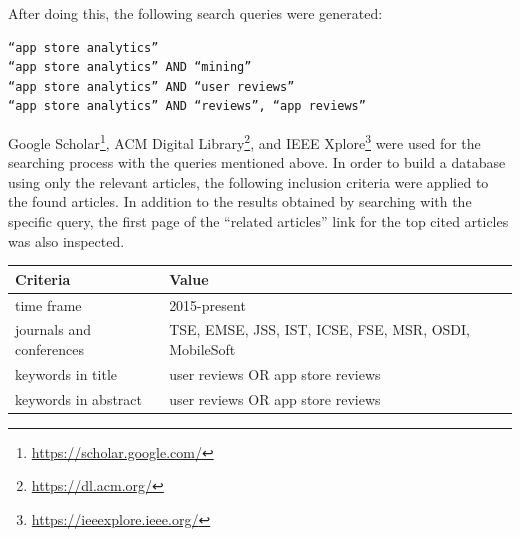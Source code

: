 \documentclass[]{book}
\let\rmarkdownfootnote\footnote%
\def\footnote{\protect\rmarkdownfootnote}
\begin{document}
After doing this, the following search queries were generated:

\begin{verbatim}
“app store analytics” 
“app store analytics” AND “mining” 
“app store analytics” AND “user reviews” 
“app store analytics” AND “reviews”, “app reviews”
\end{verbatim}

Google Scholar\footnote{\url{https://scholar.google.com/}}, ACM Digital
Library\footnote{\url{https://dl.acm.org/}}, and IEEE Xplore\footnote{\url{https://ieeexplore.ieee.org/}}
were used for the searching process with the queries mentioned above. In
order to build a database using only the relevant articles, the
following inclusion criteria were applied to the found articles. In
addition to the results obtained by searching with the specific query,
the first page of the ``related articles'' link for the top cited
articles was also inspected.

\begin{longtable}[]{@{}ll@{}}
\toprule
\begin{minipage}[b]{0.22\columnwidth}\raggedright\strut
Criteria\strut
\end{minipage} & \begin{minipage}[b]{0.18\columnwidth}\raggedright\strut
Value\strut
\end{minipage}\tabularnewline
\midrule
\endhead
\begin{minipage}[t]{0.22\columnwidth}\raggedright\strut
time frame\strut
\end{minipage} & \begin{minipage}[t]{0.18\columnwidth}\raggedright\strut
2015-present\strut
\end{minipage}\tabularnewline
\begin{minipage}[t]{0.22\columnwidth}\raggedright\strut
journals and conferences\strut
\end{minipage} & \begin{minipage}[t]{0.18\columnwidth}\raggedright\strut
TSE, EMSE, JSS, IST, ICSE, FSE, MSR, OSDI, MobileSoft\strut
\end{minipage}\tabularnewline
\begin{minipage}[t]{0.22\columnwidth}\raggedright\strut
keywords in title\strut
\end{minipage} & \begin{minipage}[t]{0.18\columnwidth}\raggedright\strut
user reviews OR app store reviews\strut
\end{minipage}\tabularnewline
\begin{minipage}[t]{0.22\columnwidth}\raggedright\strut
keywords in abstract\strut
\end{minipage} & \begin{minipage}[t]{0.18\columnwidth}\raggedright\strut
user reviews OR app store reviews\strut
\end{minipage}\tabularnewline
\bottomrule
\end{longtable}
\end{document}
